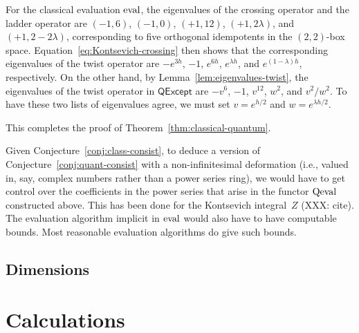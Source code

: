 \documentclass[12pt]{amsart}
\begin{document}
For the classical evaluation $\operatorname{eval}$, the eigenvalues of the crossing
operator and the ladder operator
are $(-1, 6)$, $(-1, 0)$, $(+1, 12)$, $(+1, 2\lambda)$, and
$(+1, 2-2\lambda)$, corresponding to five orthogonal idempotents in the
$(2,2)$-box space. Equation~\eqref{eq:Kontsevich-crossing} then shows
that the corresponding eigenvalues of the twist operator are
$-e^{3h}$, $-1$, $e^{6h}$, $e^{\lambda h}$, and
$e^{(1-\lambda)h}$, respectively.
On the other hand, by Lemma~\ref{lem:eigenvalues-twist}, the
eigenvalues of the twist
operator in $\mathsf{QExcept}$ are $-v^6$, $-1$, $v^{12}$, $w^2$, and
$v^2/w^2$. To have these two lists of eigenvalues agree, we must
set $v = e^{h/2}$ and $w = e^{\lambda h/2}$.

This completes the proof of Theorem~\ref{thm:classical-quantum}.

\begin{remark}
  Given Conjecture~\ref{conj:class-consist}, to deduce a version of
  Conjecture~\ref{conj:quant-consist} with a non-infinitesimal
  deformation (i.e., valued in, say, complex numbers rather than a
  power series ring), we would have to get control over the
  coefficients in the power series that arise in the functor $\operatorname{Qeval}$
  constructed above. This has been done for the Kontsevich
  integral~$Z$ (XXX: cite). The evaluation algorithm implicit in
  $\operatorname{eval}$ would also have to have computable bounds.  Most
  reasonable evaluation algorithms do give such bounds.
\end{remark}



\subsection{Dimensions}

\section{Calculations}
\label{sec:calculations}
\newcommand{\V}{\mathcal{P}}
\end{document}
